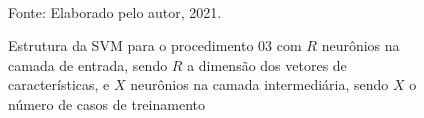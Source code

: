 \begin{figure}
	\centering
	\caption{Estrutura da SVM para o procedimento 03 com $R$ neurônios na camada de entrada, sendo $R$ a dimensão dos vetores de características, e $X$ neurônios na camada intermediária, sendo $X$ o número de casos de treinamento}
	\scalebox{2}{
		
	}
	\label{fig:3layersSVM}
	\\Fonte: Elaborado pelo autor, 2021.
\end{figure} 